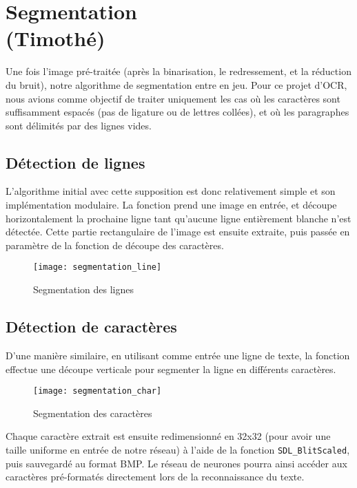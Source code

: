 \chapter{Segmentation\\ (Timothé)}

Une fois l'image pré-traitée (après la binarisation, le redressement, et la
réduction du bruit), notre algorithme de segmentation entre en jeu. Pour ce
projet d'OCR, nous avions comme objectif de traiter uniquement les cas où les
caractères sont suffisamment espacés (pas de ligature ou de lettres collées), et
où les paragraphes sont délimités par des lignes vides.

\section{Détection de lignes}

L'algorithme initial avec cette supposition est donc relativement simple et son
implémentation modulaire. La fonction prend une image en entrée, et découpe
horizontalement la prochaine ligne tant qu'aucune ligne entièrement blanche
n'est détectée. Cette partie rectangulaire de l'image est ensuite extraite, puis
passée en paramètre de la fonction de découpe des caractères.

\begin{figure}[H]
    \centering
    \texttt{[image: segmentation\_line]}
    \caption{Segmentation des lignes}
\end{figure}

\section{Détection de caractères}

D'une manière similaire, en utilisant comme entrée une ligne de texte, la
fonction effectue une découpe verticale pour segmenter la ligne en différents
caractères.

\begin{figure}[H]
    \centering
    \texttt{[image: segmentation\_char]}
    \caption{Segmentation des caractères}
\end{figure}

Chaque caractère extrait est ensuite redimensionné en 32x32 (pour avoir une
taille uniforme en entrée de notre réseau) à l'aide de la fonction
\texttt{SDL_BlitScaled}, puis sauvegardé au format BMP. Le réseau de
neurones pourra ainsi accéder aux caractères pré-formatés directement lors de la
reconnaissance du texte.

